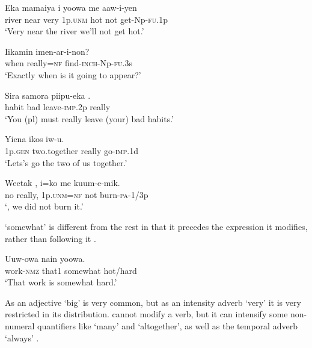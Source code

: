 \ea%
\label{ex:3:x706}
\gll Eka mamaiya  i yoowa me aaw-i-yen \\
river near very 1p.\textsc{unm} hot not get-Np-\textsc{fu}.1p\\
\glt`Very near the river we'll not get hot.'
\z

\ea%
\label{ex:3:x708}
\gll Iikamin  imen-ar-i-non? \\
when really=\textsc{nf} find-\textsc{inch}-Np-\textsc{fu}.3s\\
\glt`Exactly when is it going to appear?'
\z

\ea%
\label{ex:3:x709}
\gll Sira samora piipu-eka . \\
habit bad leave-\textsc{imp}.2p really\\
\glt`You (pl) must really leave (your) bad habits.'
\z

\ea%
\label{ex:3:x710}
\gll Yiena ikos  iw-u. \\
1p.\textsc{gen} two.together really go-\textsc{imp}.1d\\
\glt`Lets's go  the two of us together.'
\z

\ea%
\label{ex:3:x1875}
\gll Weetak , i=ko me kuum-e-mik. \\
no really, 1p.\textsc{unm}=\textsc{nf} not burn-\textsc{pa}-1/3p\\
\glt`, we did not burn it.'
\z

 `somewhat' is different from the rest in that it precedes the expression it modifies, rather than following it  .

\ea%
\label{ex:3:x703}
\gll Uuw-owa nain   yoowa. \\
work-\textsc{nmz} that1 somewhat hot/hard\\
\glt`That work is somewhat hard.'
\z

As an adjective  `big' is very common, but as an intensity adverb `very' it is very restricted in its distribution.  cannot modify a verb, but it can intensify some non-numeral quantifiers like  `many' and  `altogether', as well as the temporal adverb  `always'  . 

